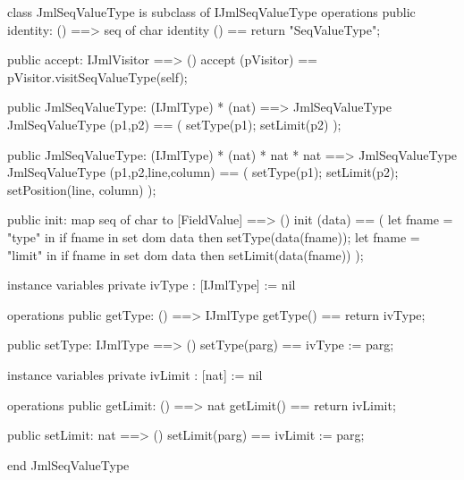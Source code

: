 \begin{vdm_al}
class JmlSeqValueType is subclass of IJmlSeqValueType
operations
  public identity: () ==> seq of char
  identity () == return "SeqValueType";

  public accept: IJmlVisitor ==> ()
  accept (pVisitor) == pVisitor.visitSeqValueType(self);

  public JmlSeqValueType:
    (IJmlType) *
    (nat) ==> JmlSeqValueType
  JmlSeqValueType (p1,p2) == 
    ( setType(p1);
      setLimit(p2) );

  public JmlSeqValueType:
    (IJmlType) *
    (nat) *
    nat *
    nat ==> JmlSeqValueType
  JmlSeqValueType (p1,p2,line,column) == 
    ( setType(p1);
      setLimit(p2);
      setPosition(line, column) );

  public init: map seq of char to [FieldValue] ==> ()
  init (data) ==
    ( let fname = "type" in
        if fname in set dom data
        then setType(data(fname));
      let fname = "limit" in
        if fname in set dom data
        then setLimit(data(fname)) );

instance variables
  private ivType : [IJmlType] := nil

operations
  public getType: () ==> IJmlType
  getType() == return ivType;

  public setType: IJmlType ==> ()
  setType(parg) == ivType := parg;

instance variables
  private ivLimit : [nat] := nil

operations
  public getLimit: () ==> nat
  getLimit() == return ivLimit;

  public setLimit: nat ==> ()
  setLimit(parg) == ivLimit := parg;

end JmlSeqValueType
\end{vdm_al}

